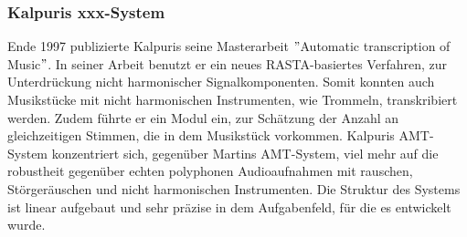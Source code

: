 \subsubsection{Kalpuris xxx-System}
Ende 1997 publizierte Kalpuris seine Masterarbeit \("\)Automatic transcription of Music\("\).
\cite{klapuri1998automatic}
In seiner Arbeit benutzt er ein neues RASTA-basiertes Verfahren, zur Unterdrückung nicht harmonischer Signalkomponenten.
Somit konnten auch Musikstücke mit nicht harmonischen Instrumenten, wie Trommeln, transkribiert werden.
Zudem führte er ein Modul ein, zur Schätzung der Anzahl an gleichzeitigen Stimmen, die in dem Musikstück vorkommen.
Kalpuris AMT-System konzentriert sich, gegenüber Martins AMT-System, viel mehr auf die robustheit gegenüber
echten polyphonen Audioaufnahmen mit rauschen, Störgeräuschen und nicht harmonischen Instrumenten.
Die Struktur des Systems ist linear aufgebaut und sehr präzise in dem Aufgabenfeld, für die es entwickelt wurde.


